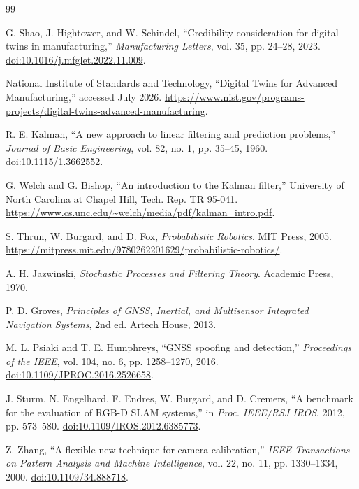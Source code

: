 \documentclass[11pt,oneside]{book}
\begin{document}
\backmatter

\begin{thebibliography}{99}

G. Shao, J. Hightower, and W. Schindel,
``Credibility consideration for digital twins in manufacturing,''
\emph{Manufacturing Letters}, vol. 35, pp. 24--28, 2023.
\href{https://doi.org/10.1016/j.mfglet.2022.11.009}
{doi:10.1016/j.mfglet.2022.11.009}.

National Institute of Standards and Technology,
``Digital Twins for Advanced Manufacturing,'' accessed July 2026.
\url{https://www.nist.gov/programs-projects/digital-twins-advanced-manufacturing}.

R. E. Kalman, ``A new approach to linear filtering and prediction problems,''
\emph{Journal of Basic Engineering}, vol. 82, no. 1, pp. 35--45, 1960.
\href{https://doi.org/10.1115/1.3662552}{doi:10.1115/1.3662552}.

G. Welch and G. Bishop, ``An introduction to the Kalman filter,''
University of North Carolina at Chapel Hill, Tech. Rep. TR 95-041.
\url{https://www.cs.unc.edu/~welch/media/pdf/kalman_intro.pdf}.

S. Thrun, W. Burgard, and D. Fox,
\emph{Probabilistic Robotics}. MIT Press, 2005.
\url{https://mitpress.mit.edu/9780262201629/probabilistic-robotics/}.

A. H. Jazwinski, \emph{Stochastic Processes and Filtering Theory}.
Academic Press, 1970.

P. D. Groves,
\emph{Principles of GNSS, Inertial, and Multisensor Integrated Navigation
Systems}, 2nd ed. Artech House, 2013.

M. L. Psiaki and T. E. Humphreys, ``GNSS spoofing and detection,''
\emph{Proceedings of the IEEE}, vol. 104, no. 6, pp. 1258--1270, 2016.
\href{https://doi.org/10.1109/JPROC.2016.2526658}
{doi:10.1109/JPROC.2016.2526658}.

J. Sturm, N. Engelhard, F. Endres, W. Burgard, and D. Cremers,
``A benchmark for the evaluation of RGB-D SLAM systems,''
in \emph{Proc. IEEE/RSJ IROS}, 2012, pp. 573--580.
\href{https://doi.org/10.1109/IROS.2012.6385773}
{doi:10.1109/IROS.2012.6385773}.

Z. Zhang, ``A flexible new technique for camera calibration,''
\emph{IEEE Transactions on Pattern Analysis and Machine Intelligence},
vol. 22, no. 11, pp. 1330--1334, 2000.
\href{https://doi.org/10.1109/34.888718}{doi:10.1109/34.888718}.


\end{thebibliography}
\end{document}
